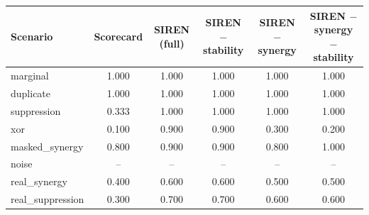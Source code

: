 \begin{tabular}{lccccc}
\toprule
Scenario & Scorecard & SIREN (full) & SIREN $-$ stability & SIREN $-$ synergy & SIREN $-$ synergy $-$ stability \\
\midrule
marginal & 1.000 & 1.000 & 1.000 & 1.000 & 1.000 \\
duplicate & 1.000 & 1.000 & 1.000 & 1.000 & 1.000 \\
suppression & 0.333 & 1.000 & 1.000 & 1.000 & 1.000 \\
xor & 0.100 & 0.900 & 0.900 & 0.300 & 0.200 \\
masked\_synergy & 0.800 & 0.900 & 0.900 & 0.800 & 1.000 \\
noise & -- & -- & -- & -- & -- \\
real\_synergy & 0.400 & 0.600 & 0.600 & 0.500 & 0.500 \\
real\_suppression & 0.300 & 0.700 & 0.700 & 0.600 & 0.600 \\
\bottomrule
\end{tabular}